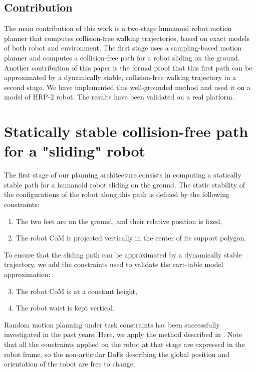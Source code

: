 \documentclass{article}
\begin{document}
\subsection{Contribution}

The main contribution of this work is a two-stage humanoid robot motion planner
that computes collision-free walking trajectories, based on
exact models of both robot and environment. The first stage uses a
sampling-based motion 
planner and  computes a collision-free path  for a robot  sliding on the
ground. Another  contribution of this  paper is the formal  proof that
this first path can be  approximated by a dynamically stable, collision-free
walking  trajectory in a second stage. We have implemented this well-grounded 
method and  used it on a model of  HRP-2 robot.  The results have been  
validated on a real platform.



\section{Statically stable collision-free path for a "sliding" robot}

\label{sec:sliding}

The first stage  of our planning architecture consists  in computing a
statically stable  path for  a humanoid robot  sliding on  the ground.
The static  stability of the configurations of the
robot along this path is defined by the following constraints:
\begin{enumerate}
\item The two  feet are on the ground, and  their relative position is
  fixed,
\item The robot CoM is projected vertically in  the center of its
  support polygon. 
\end{enumerate}
To ensure that the sliding path  can be approximated by a dynamically
stable  trajectory,  we add the constraints used to validate 
the cart-table model approximation:
\begin{enumerate}
\setcounter{enumi}{2}
\item The robot CoM is at a constant height,
\item The robot waist is kept vertical.
\end{enumerate}

Random  motion planning  under task  constraints has  been successfully
investigated in the past years. Here, we apply the method described in
\cite{dalibard09}. Note  that all the constraints  applied on the  robot at that
stage are  expressed in the  robot frame, so the  non-articular DoFs
describing the global  position and orientation of the  robot are free
to change.
\end{document}

